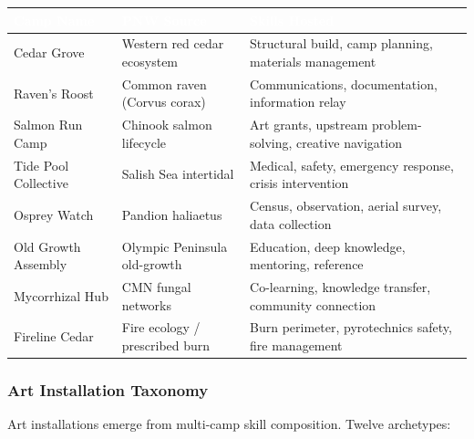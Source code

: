 \documentclass[11pt,letterpaper]{article}
\newcommand{\tableheader}[1]{\textbf{\sffamily\textcolor{white}{#1}}}
\begin{document}
\begin{center}
\begin{tabularx}{\textwidth}{L{3.5cm}L{3cm}X}
\toprule
{}
\tableheader{Camp Name} & \tableheader{PNW Source} & \tableheader{Skills Hosted} \\
\midrule
Cedar Grove & Western red cedar ecosystem & Structural build, camp planning, materials management \\
Raven's Roost & Common raven (Corvus corax) & Communications, documentation, information relay \\
Salmon Run Camp & Chinook salmon lifecycle & Art grants, upstream problem-solving, creative navigation \\
Tide Pool Collective & Salish Sea intertidal & Medical, safety, emergency response, crisis intervention \\
Osprey Watch & Pandion haliaetus & Census, observation, aerial survey, data collection \\
Old Growth Assembly & Olympic Peninsula old-growth & Education, deep knowledge, mentoring, reference \\
Mycorrhizal Hub & CMN fungal networks & Co-learning, knowledge transfer, community connection \\
Fireline Cedar & Fire ecology / prescribed burn & Burn perimeter, pyrotechnics safety, fire management \\
\bottomrule
\end{tabularx}
\end{center}

\subsubsection{Art Installation Taxonomy}

Art installations emerge from multi-camp skill composition. Twelve archetypes:
\end{document}
